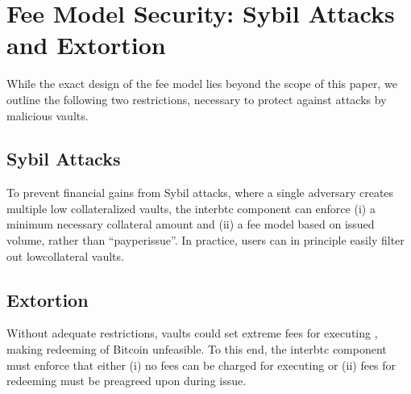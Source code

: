 \documentclass[a4paper,10pt,english]{sphinxmanual}
\begin{document}
\section{Fee Model Security: Sybil Attacks and Extortion}
\label{\detokenize{security_performance/security-analysis:fee-model-security-sybil-attacks-and-extortion}}
While the exact design of the fee model lies beyond the scope of this paper, we outline the following two restrictions, necessary to protect against attacks by malicious vaults.


\subsection{Sybil Attacks}
\label{\detokenize{security_performance/security-analysis:sybil-attacks}}
To prevent financial gains from Sybil attacks, where a single adversary creates multiple low collateralized vaults, the interbtc component can enforce (i) a minimum necessary collateral amount and (ii) a fee model based on issued volume, rather than “pay\sphinxhyphen{}per\sphinxhyphen{}issue”.
In practice, users can in principle easily filter out low\sphinxhyphen{}collateral vaults.


\subsection{Extortion}
\label{\detokenize{security_performance/security-analysis:extortion}}
Without adequate restrictions, vaults could set extreme fees for executing {\hyperref[\detokenize{spec/redeem:redeem-protocol}]{}}, making redeeming of Bitcoin unfeasible.
To this end, the interbtc component must enforce that either (i) no fees can be charged for executing {\hyperref[\detokenize{spec/redeem:redeem-protocol}]{}} or (ii) fees for redeeming must be pre\sphinxhyphen{}agreed upon during issue.
\end{document}
